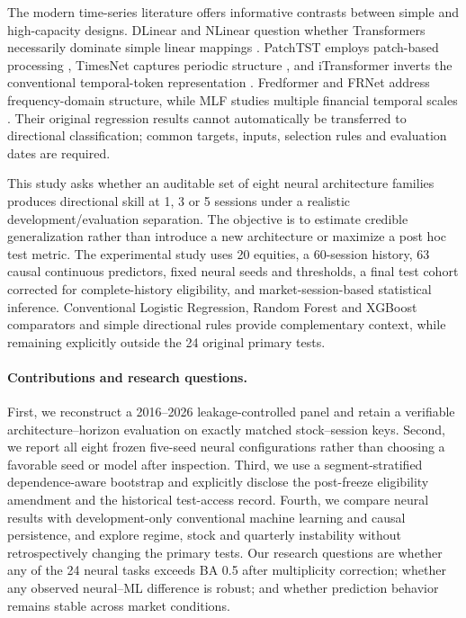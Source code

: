 \documentclass[fleqn,10pt]{wlscirep}
\begin{document}
The modern time-series literature offers informative contrasts between simple and high-capacity designs. DLinear and NLinear question whether Transformers necessarily dominate simple linear mappings \cite{Zeng2023LTSFLinear}. PatchTST employs patch-based processing \cite{Nie2023PatchTST}, TimesNet captures periodic structure \cite{Wu2023TimesNet}, and iTransformer inverts the conventional temporal-token representation \cite{Liu2024iTransformer}. Fredformer and FRNet address frequency-domain structure, while MLF studies multiple financial temporal scales \cite{Piao2024Fredformer,Zhang2024FRNet,Zhang2025MLF}. Their original regression results cannot automatically be transferred to directional classification; common targets, inputs, selection rules and evaluation dates are required.

This study asks whether an auditable set of eight neural architecture families produces directional skill at 1, 3 or 5 sessions under a realistic development/evaluation separation. The objective is to estimate credible generalization rather than introduce a new architecture or maximize a post hoc test metric. The experimental study uses 20 equities, a 60-session history, 63 causal continuous predictors, fixed neural seeds and thresholds, a final test cohort corrected for complete-history eligibility, and market-session-based statistical inference. Conventional Logistic Regression, Random Forest and XGBoost comparators and simple directional rules provide complementary context, while remaining explicitly outside the 24 original primary tests.

\paragraph{Contributions and research questions.} First, we reconstruct a 2016--2026 leakage-controlled panel and retain a verifiable architecture--horizon evaluation on exactly matched stock--session keys. Second, we report all eight frozen five-seed neural configurations rather than choosing a favorable seed or model after inspection. Third, we use a segment-stratified dependence-aware bootstrap and explicitly disclose the post-freeze eligibility amendment and the historical test-access record. Fourth, we compare neural results with development-only conventional machine learning and causal persistence, and explore regime, stock and quarterly instability without retrospectively changing the primary tests. Our research questions are whether any of the 24 neural tasks exceeds BA 0.5 after multiplicity correction; whether any observed neural--ML difference is robust; and whether prediction behavior remains stable across market conditions.
\end{document}

